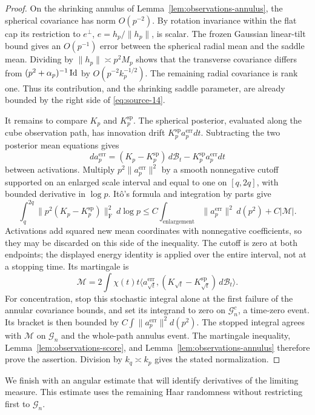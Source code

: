 \begin{proof}
On the shrinking annulus of Lemma~\ref{lem:observations-annulus}, the
spherical covariance has norm $O(p^{-2})$. By rotation invariance within
the flat cap its restriction to $e^\perp$, $e=h_p/\|h_p\|$, is scalar.
The frozen Gaussian linear-tilt bound gives an $O(p^{-1})$ error between
the spherical radial mean and the saddle mean. Dividing by
$\|h_p\|\asymp p^2M_p$ shows that the transverse covariance differs
from $(p^2+\alpha_p)^{-1}\operatorname{Id}$ by $O(p^{-2}k_p^{-1/2})$.
The remaining radial covariance is rank one. Thus its contribution,
and the shrinking saddle parameter, are already bounded by the right
side of \eqref{eq:source-14}.

It remains to compare $K_p$ and $K_p^{\mathrm{sp}}$. The spherical
posterior, evaluated along the cube observation path, has innovation
drift $K_p^{\mathrm{sp}}a_p^{\mathrm{err}}dt$. Subtracting the two
posterior mean equations gives
\[
 da_p^{\mathrm{err}}
 =(K_p-K_p^{\mathrm{sp}})\,d\mathcal B_t
       -K_p^{\mathrm{sp}}a_p^{\mathrm{err}}dt
\]
between activations. Multiply $p^2\|a_p^{\mathrm{err}}\|^2$ by a smooth
nonnegative cutoff supported on an enlarged scale interval and equal to
one on $[q,2q]$, with bounded derivative in $\log p$. It\^o's formula
and integration by parts give
\[
 \int_q^{2q}\|p^2(K_p-K_p^{\mathrm{sp}})\|_{\mathrm F}^2\,d\log p
 \le C\int_{\mathrm{enlargement}}\|a_p^{\mathrm{err}}\|^2\,d(p^2)
       +C|\mathcal M|.
\]
Activations add squared new mean coordinates with nonnegative coefficients,
so they may be discarded on this side of the inequality. The cutoff is
zero at both endpoints; the displayed energy identity is applied over the
entire interval, not at a stopping time. Its martingale is
\[
 \mathcal M=2\int\chi(t)t
   \langle a_{\sqrt t}^{\mathrm{err}},
      (K_{\sqrt t}-K_{\sqrt t}^{\mathrm{sp}})\,d\mathcal B_t\rangle.
\]
For concentration, stop this stochastic integral alone at the first
failure of the annular covariance bounds, and set its integrand to zero
on $\mathcal G_n^c$, a time-zero event. Its bracket is then bounded by
$C\int\|a_p^{\mathrm{err}}\|^2d(p^2)$. The stopped integral agrees with
$\mathcal M$ on $\mathcal G_n$ and the whole-path annulus event.
The martingale inequality, Lemma~\ref{lem:observations-score}, and
Lemma~\ref{lem:observations-annulus} therefore prove the assertion.
Division by $k_q\asymp k_p$ gives the stated normalization.
\end{proof}

We finish with an angular estimate that will identify derivatives of the
limiting measure. This estimate uses the remaining Haar randomness without
restricting first to $\mathcal G_n$.


